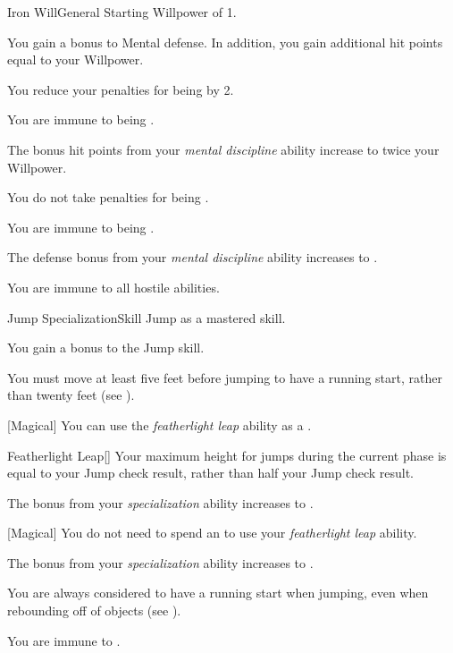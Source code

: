     \begin{feat}{Iron Will}{General}
        \featpre Starting Willpower of 1.

         You gain a  bonus to Mental defense.
        In addition, you gain additional hit points equal to your Willpower.

         You reduce your penalties for being  by 2.

         You are immune to being .

         The bonus hit points from your \textit{mental discipline} ability increase to twice your Willpower.

         You do not take penalties for being .

         You are immune to being .

         The defense bonus from your \textit{mental discipline} ability increases to .

         You are immune to all hostile  abilities.
    \end{feat}

    \begin{feat}{Jump Specialization}{Skill}
        \featpre Jump as a mastered skill.

         You gain a  bonus to the Jump skill.

         You must move at least five feet before jumping to have a running start, rather than twenty feet (see ).

        [Magical] You can use the \textit{featherlight leap} ability as a .
        \begin{apability}{Featherlight Leap}[]
            Your maximum height for jumps during the current phase is equal to your Jump check result, rather than half your Jump check result.
        \end{apability}

         The bonus from your \textit{specialization} ability increases to .

        [Magical] You do not need to spend an  to use your \textit{featherlight leap} ability.

         The bonus from your \textit{specialization} ability increases to .

         You are always considered to have a running start when jumping, even when rebounding off of objects (see ).

         You are immune to .
    \end{feat}

